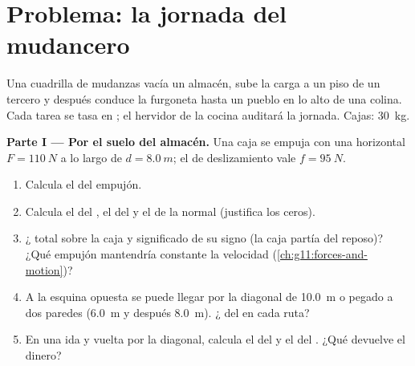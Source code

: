 \section{Problema: la jornada del mudancero}

\begin{problem}
\label{pb:g11:work-of-force:1}
Una cuadrilla de mudanzas vacía un almacén, sube la carga a un piso de
un tercero y después conduce la furgoneta hasta un pueblo en lo alto de
una colina. Cada tarea se tasa en ; el hervidor de la cocina
auditará la jornada. Cajas: \qty{30}{kg}.

\medskip
\noindent\textbf{Parte I --- Por el suelo del almacén.}
Una caja se empuja con una  horizontal $F = \qty{110}{N}$ a lo
largo de $d = \qty{8.0}{m}$; el  de deslizamiento vale
$f = \qty{95}{N}$.
\begin{enumerate}
  \item Calcula el  del empujón.
  \item Calcula el  del , el del  y el de la 
        normal (justifica los ceros).
  \item ¿ total sobre la caja y significado de su signo (la caja
        partía del reposo)? ¿Qué empujón mantendría constante la
        velocidad (\cref{ch:g11:forces-and-motion})?
  \item A la esquina opuesta se puede llegar por la diagonal de
        \qty{10.0}{m} o pegado a dos paredes (\qty{6.0}{m} y después
        \qty{8.0}{m}). ¿ del  en cada ruta?
  \item En una ida y vuelta por la diagonal, calcula el  del
         y el del . ¿Qué  devuelve el dinero?
\end{enumerate}


\end{problem}
